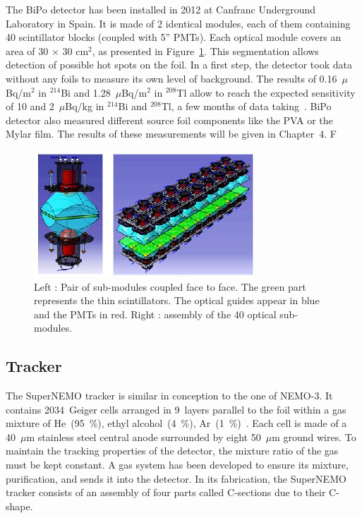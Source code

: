 \documentclass[main.tex]{subfiles}
\begin{document}
\NI The BiPo detector has been installed in 2012 at Canfranc Underground Laboratory in Spain. It is made of 2 identical modules, each of them containing 40 scintillator blocks (coupled with 5'' PMTs). Each optical module covers an area of 30 $\times$ 30 cm$^\text{2}$, as presented in Figure~\ref{BiPoDetector}. This segmentation allows detection of possible hot spots on the foil. In a first step, the detector took data without any foils to measure its own level of background. The results of 0.16~$\mu$Bq/m$^\text{2}$ in $^{\text{214}}$Bi and 1.28~$\mu$Bq/m$^\text{2}$ in $^{\text{208}}$Tl allow to reach the expected sensitivity of 10 and 2~$\mu$Bq/kg in $^{\text{214}}$Bi and $^{\text{208}}$Tl, a few months of data taking~\cite{BiPoDetector}. BiPo detector also measured different source foil components like the PVA or the Mylar film. The results of these measurements will be given in Chapter~4. F%


\begin{figure}[h!]
\begin{center}
\includegraphics[scale=1.1]{pictures/Chap3/snemo_bipo.png}
\caption{Left : Pair of sub-modules coupled face to face. The green part represents the thin scintillators. The optical guides appear in blue and the PMTs in red. Right : assembly of the 40 optical sub-modules.}
\label{BiPoDetector}
\end{center}
\end{figure}



\FloatBarrier


\subsection{Tracker}


\NI The SuperNEMO tracker is similar in conception to the one of NEMO-3. It contains 2034~Geiger cells arranged in 9~layers parallel to the foil within a gas mixture of He~(95~\%), ethyl alcohol~(4~\%), Ar~(1~\%)~\cite{trackerSN}. Each cell is made of a 40~$\mu$m stainless steel central anode surrounded by eight 50~$\mu$m ground wires. To maintain the tracking properties of the detector, the mixture ratio of the gas must be kept constant. A gas system has been developed to ensure its mixture, purification, and sends it into the detector. In its fabrication, the SuperNEMO tracker consists of an assembly of four parts called C-sections due to their C-shape. 
\end{document}
